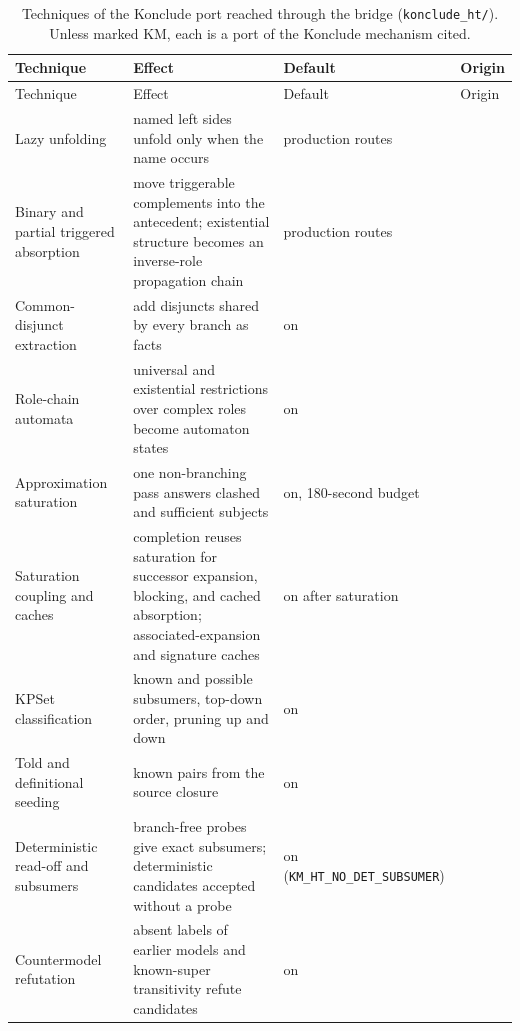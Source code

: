 \begin{small}
\begin{longtable}{@{}p{}p{}p{}p{}@{}}
\caption{Techniques of the Konclude port reached through the bridge
(\texttt{konclude\_ht/}).  Unless marked KM, each is a port of the Konclude
mechanism cited.}
\label{tab:opt-bridge}\\
\toprule
Technique & Effect & Default & Origin\\
\midrule
\endfirsthead
\toprule
Technique & Effect & Default & Origin\\
\midrule
\endhead
Lazy unfolding & named left sides unfold only when the name occurs & production routes & \cite{horrocks2000axioms}\\
Binary and partial triggered absorption & move triggerable complements into the antecedent; existential structure becomes an inverse-role propagation chain & production routes & \cite{hudek2006binary,steigmiller2014absorption}\\
Common-disjunct extraction & add disjuncts shared by every branch as facts & on & \cite{steigmiller2016thesis}\\
Role-chain automata & universal and existential restrictions over complex roles become automaton states & on & \cite{horrocks2006sroiq}\\
Approximation saturation & one non-branching pass answers clashed and sufficient subjects & on, 180-second budget & \cite{steigmiller2014coupling,steigmiller2015payg}\\
Saturation coupling and caches & completion reuses saturation for successor expansion, blocking, and cached absorption; associated-expansion and signature caches & on after saturation & \cite{steigmiller2012extended,steigmiller2015payg}\\
KPSet classification & known and possible subsumers, top-down order, pruning up and down & on & \cite{glimm2012novel,steigmiller2016thesis}\\
Told and definitional seeding & known pairs from the source closure & on & \cite{baader1994empirical}\\
Deterministic read-off and subsumers & branch-free probes give exact subsumers; deterministic candidates accepted without a probe & on (\texttt{KM\_HT\_NO\_DET\_SUBSUMER}) & \cite{glimm2012novel,steigmiller2016thesis}\\
Countermodel refutation & absent labels of earlier models and known-super transitivity refute candidates & on & \cite{glimm2012novel}\\

\end{longtable}
\end{small}
